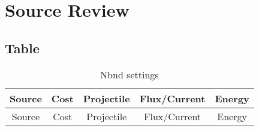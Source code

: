 \section{Source Review}


\subsection{Table}






\begin{table}[h]
\caption{Nbnd settings}
\begin{center}
\begin{tabular}{c c c c c}
\hline\hline
Source & Cost & Projectile & Flux/Current & Energy \\
\hline
Source & Cost & Projectile & Flux/Current & Energy \\
\end{tabular}
\end{center}
\end{table}



